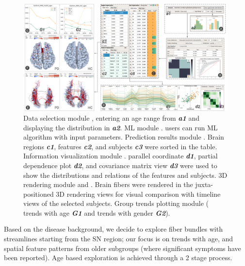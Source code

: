 \begin{figure}[t]
\centering
\includegraphics[width=0.99\textwidth]{images/fusiformSteps_v5.png}
\caption{ Data selection module , entering an age range from \textbf{\textit{a1}} and displaying the distribution in \textbf{\textit{a2}}. ML module . users can run ML algorithm with input parameters. Prediction results module . Brain regions \textbf{\textit{c1}}, features \textbf{\textit{c2}}, and subjects \textbf{\textit{c3}} were sorted in the table. Information visualization module . parallel coordinate \textbf{\textit{d1}}, partial dependence plot \textbf{\textit{d2}}, and covariance matrix view \textbf{\textit{d3}} were used to show the distributions and relations of the features and subjects. 3D rendering module  and . Brain fibers were rendered in the juxta-positioned 3D rendering views for visual comparison with timeline views of the selected subjects. Group trends plotting module  ( trends with age \textbf{\textit{G1}} and trends with gender \textbf{\textit{G2}}).}
\label{fig:fusformSteps}
\end{figure}

\noindent Based on the disease background,
we decide to explore fiber bundles with streamlines starting from the SN region; our focus is on trends with age, and spatial feature patterns from older subgroups (where significant symptoms have been reported). Age based exploration is achieved through a 2 stage process.  

